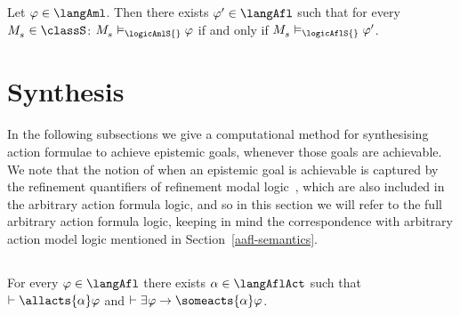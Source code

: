 \begin{corollary}
Let $\phi \in \langAml$. 
Then there exists $\phi' \in \langAfl$ such that for every $\kPModel{\kStateS} \in \classS$: $\kPModel{\kStateS} \entails_\logicAmlS{} \phi$ if and only if $\kPModel{\kStateS} \entails_\logicAflS{} \phi'$.
\end{corollary}

\section{Synthesis}\label{synthesis}

In the following subsections we give a computational method for synthesising action formulae to achieve epistemic goals, whenever those goals are achievable.
We note that the notion of when an epistemic goal is achievable is captured by the refinement quantifiers of refinement modal logic~\cite{vanditmarsch:2009,bozzelli:2014b}, which are also included in the arbitrary action formula logic, and so in this section we will refer to the full arbitrary action formula logic, keeping in mind the correspondence with arbitrary action model logic mentioned in Section~\ref{aafl-semantics}.

\subsection{\classK{}}

\begin{proposition}\label{afl-k-synthesis}
For every $\phi \in \langAfl$ there exists $\alpha \in \langAflAct$ such that $\proves \allacts{\alpha} \phi$ and $\proves \somerefs \phi \implies \someacts{\alpha} \phi$.
\end{proposition}

